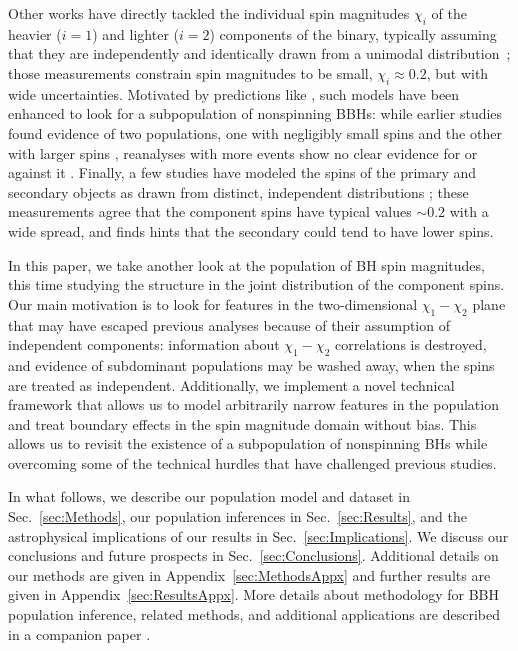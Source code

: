 \documentclass[twocolumn,usenames,dvipsnames,linenumbers]{aastex631}
\begin{document}
Other works have directly tackled the individual spin magnitudes $\chi_i$ of the heavier ($i=1$) and lighter ($i=2$) components of the binary, typically assuming that they are independently and identically drawn from a unimodal distribution~\citep{2018PhRvD..97d3014W,LIGOScientific:2018jsj,LIGOScientific:2020kqk,KAGRA:2021duu}; those measurements constrain spin magnitudes to be small, $\chi_i \approx 0.2$, but with wide uncertainties.
Motivated by predictions like \cite{Fuller:2019sxi}, such models have been enhanced to look for a subpopulation of nonspinning \acp{BBH}:
while earlier studies found evidence of two populations, one with negligibly small spins and the other with larger spins \citep{Galaudage2021,Roulet:2021hcu,2022ApJ...928...75H,Kimball:2020qyd}, reanalyses with more events show no clear evidence for or against it \citep{Tong2022,Callister:2022qwb}.
%
Finally, a few studies have modeled the spins of the primary and secondary objects as drawn from distinct, independent distributions \citep{Tong2022,Mould:2022xeu,Adamcewicz2024,Golomb:2022bon,Edelman:2022ydv};
these measurements agree that the component spins have typical values ${\sim}0.2$ with a wide spread, and \cite{Mould:2022xeu} finds hints that the secondary could tend to have lower spins.

In this paper, we take another look at the population of \ac{BH} spin magnitudes, this time studying the structure in the joint distribution of the component spins.
Our main motivation is to look for features in the two-dimensional $\chi_1{-}\chi_2$ plane that may have escaped previous analyses because of their assumption of independent components: 
information about $\chi_1{-}\chi_2$ correlations is destroyed, and evidence of subdominant populations may be washed away, when the spins are treated as independent.
Additionally, we implement a novel technical framework that allows us to model arbitrarily narrow features in the population and treat boundary effects in the spin magnitude domain without bias.
This allows us to revisit the existence of a subpopulation of nonspinning \acp{BH} while overcoming some of the technical hurdles that have challenged previous studies.

In what follows, we describe our population model and dataset in Sec.~\ref{sec:Methods}, our population inferences in Sec.~\ref{sec:Results}, and the astrophysical implications of our results in Sec.~\ref{sec:Implications}.
We discuss our conclusions and future prospects in Sec.~\ref{sec:Conclusions}.
Additional details on our methods are given in Appendix~\ref{sec:MethodsAppx} and further results are given in Appendix~\ref{sec:ResultsAppx}. 
More details about methodology for \ac{BBH} population inference, related methods, and additional applications are described in a companion paper \cite{TGMM_Methods}.
\end{document}
